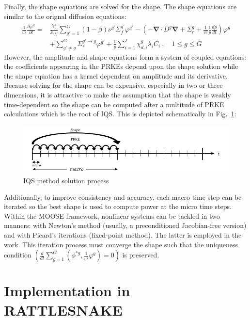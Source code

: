 \documentclass[12pt]{article}
\newcommand{\bs}[1]{\mathbf{#1}}
\renewcommand{\div}{\bs{\nabla}\! \cdot \!}
\newcommand{\grad}{\bs{\nabla}}
\newcommand{\fig}[1]{Fig.~\ref{#1}}                      %
\newcommand{\keff}{k_\textit{eff}}
\begin{document}
Finally, the shape equations are solved for the shape. The shape equations are similar to the orignal diffusion equations:
\begin{align}
\frac{1}{v^g} \frac{\partial \varphi^g }{\partial t} =& \frac{\chi_p^g}{\keff} \sum_{g'=1}^G (1-\beta) \nu^{g'} \Sigma_f^{g'} \varphi^{g'} -  \left( -\div D^g \grad  + \Sigma_r^g + \frac{1}{v^g}\frac{1}{p}\frac{dp}{dt}\right) \varphi^g  \nonumber \\
&  + \sum_{g'\neq g}^G\Sigma_s^{g'\to g} \varphi^{g'}  + \frac{1}{p}\sum_{i=1}^I\chi_{d,i}^g\lambda_i C_i \ , \quad 1 \le g \le G 
\label{eq:shape}
\end{align}
However, the amplitude and shape equations form a system of coupled equations: the coefficients appearing in the PRKEs depend upon the shape solution while the shape equation has a kernel dependent on amplitude and its derivative.  Because solving for the shape can be expensive, especially in two or three dimensions, it is attractive to make the assumption that the shape is weakly time-dependent so the shape can be computed after a multitude of PRKE calculations which is the root of IQS.  This is depicted schematically in \fig{fig:IQS}:
%
\begin{figure}[h]
\includegraphics[width=\linewidth]{figures/IQS_visualization.jpg}
\caption{IQS method solution process}
\label{fig:IQS}
\end{figure}
%
Additionally, to improve consistency and accuracy, each macro time step can be iterated so the best shape is used to compute power at the micro time steps. Within the MOOSE framework,
nonlinear systems can be tackled in two manners: with Newton's method (usually, a preconditioned Jacobian-free version) and with Picard's iterations (fixed-point method). The latter is employed in the work. This iteration process must converge the shape such that the uniqueness condition $(\frac{d}{dt}\sum_{g=1}^G\left(\phi^{*g},\frac{1}{v^g}\varphi^g\right)=0)$ is preserved.


%
\section{Implementation in RATTLESNAKE}
\label{sect::implementation}
\end{document}
